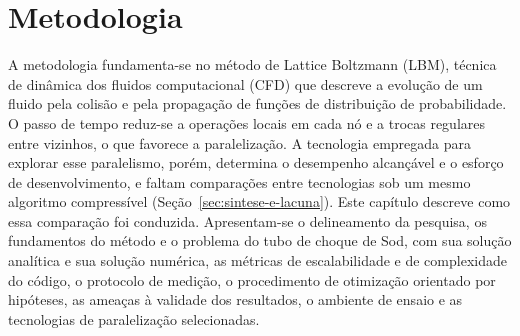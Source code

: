 
\chapter[Metodologia]{Metodologia}\label{ch:metodologia}






A metodologia fundamenta-se no método de Lattice Boltzmann (LBM), técnica de dinâmica dos fluidos computacional (CFD) que descreve a evolução de um fluido pela colisão e pela propagação de funções de distribuição de probabilidade.
O passo de tempo reduz-se a operações locais em cada nó e a trocas regulares entre vizinhos, o que favorece a paralelização.
A tecnologia empregada para explorar esse paralelismo, porém, determina o desempenho alcançável e o esforço de desenvolvimento, e faltam comparações entre tecnologias sob um mesmo algoritmo compressível (Seção~\ref{sec:sintese-e-lacuna}).
Este capítulo descreve como essa comparação foi conduzida.
Apresentam-se o delineamento da pesquisa, os fundamentos do método e o problema do tubo de choque de Sod, com sua solução analítica e sua solução numérica, as métricas de escalabilidade e de complexidade do código, o protocolo de medição, o procedimento de otimização orientado por hipóteses, as ameaças à validade dos resultados, o ambiente de ensaio e as tecnologias de paralelização selecionadas.

